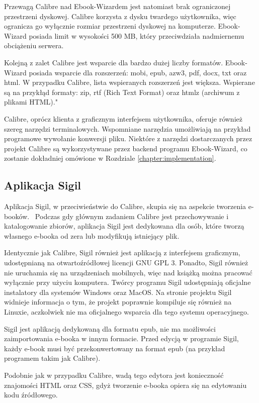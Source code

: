 Przewagą Calibre nad Ebook-Wizardem jest natomiast brak ograniczonej przestrzeni dyskowej. Calibre korzysta z dysku twardego użytkownika, więc ogranicza go wyłącznie rozmiar przestrzeni dyskowej na komputerze. Ebook-Wizard posiada limit w wysokości 500 MB, który przeciwdziała nadmiernemu obciążeniu serwera.

Kolejną z zalet Calibre jest wsparcie dla bardzo dużej liczby formatów. Ebook-Wizard posiada wsparcie dla rozszerzeń: mobi, epub, azw3, pdf, docx, txt oraz html. W przypadku Calibre, lista wspieranych rozszerzeń jest większa. Wspierane są na przykłąd formaty: zip, rtf (Rich Text Format) oraz htmlz (archiwum z plikami HTML)."

Calibre, oprócz klienta z graficznym interfejsem użytkownika, oferuje również szereg narzędzi terminalowych. Wspomniane narzędzia umożliwiają na przykład programowe wywołanie konwersji pliku. Niektóre z narzędzi dostarczanych przez projekt Calibre są wykorzystywane przez backend programu Ebook-Wizard, co zostanie dokładniej omówione w Rozdziale \ref{chapter:implementation}. 

\subsection{Aplikacja Sigil}

Aplikacja Sigil, w przeciwieństwie do Calibre, skupia się na aspekcie tworzenia e-booków.~\cite{sigil_user_guide} Podczas gdy głównym zadaniem Calibre jest przechowywanie i katalogowanie zbiorów, aplikacja Sigil jest dedykowana dla osób, które tworzą własnego e-booka od zera lub modyfikują istniejący plik.

Identycznie jak Calibre, Sigil również jest aplikacją z interfejsem graficznym, udostępnianą na otwartoźródłowej licencji GNU GPL 3. Ponadto, Sigil również nie uruchamia się na urządzeniach mobilnych, więc nad książką można pracować wyłącznie przy użyciu komputera. Twórcy programu Sigil udostępniają oficjalne instalatory dla systemów Windows oraz MacOS. Na stronie projektu Sigil widnieje informacja o tym, że projekt poprawnie kompiluje się również na Linuxie, aczkolwiek nie ma oficjalnego wsparcia dla tego systemu operacyjnego.

Sigil jest aplikacją dedykowaną dla formatu epub, nie ma możliwości zaimportowania e-booka w innym formacie. Przed edycją w programie Sigil, każdy e-book musi być przekonwertowany na format epub (na przykład programem takim jak Calibre).

Podobnie jak w przypadku Calibre, wadą tego edytora jest konieczność znajomości HTML oraz CSS, gdyż tworzenie e-booka opiera się na edytowaniu kodu źródłowego. 

